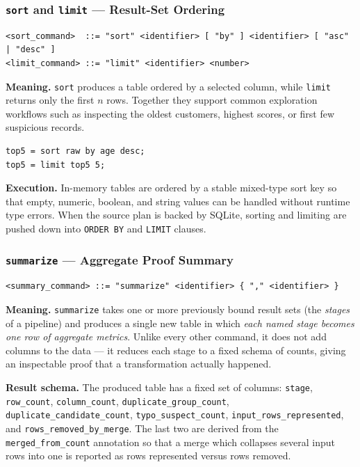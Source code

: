 \begin{itemize}[label=-, noitemsep]
\begin{itemize}[label=-, noitemsep]
\begin{itemize}[label=-, noitemsep]
\subsubsection{\texttt{sort} and \texttt{limit} --- Result-Set Ordering}

\begin{lstlisting}[style=bnf]
<sort_command>  ::= "sort" <identifier> [ "by" ] <identifier> [ "asc" | "desc" ]
<limit_command> ::= "limit" <identifier> <number>
\end{lstlisting}

\textbf{Meaning.} \texttt{sort} produces a table ordered by a selected column,
while \texttt{limit} returns only the first $n$ rows. Together they support
common exploration workflows such as inspecting the oldest customers, highest
scores, or first few suspicious records.

\begin{lstlisting}[style=dsl]
top5 = sort raw by age desc;
top5 = limit top5 5;
\end{lstlisting}

\textbf{Execution.} In-memory tables are ordered by a stable mixed-type sort
key so that empty, numeric, boolean, and string values can be handled without
runtime type errors. When the source plan is backed by SQLite, sorting and
limiting are pushed down into \texttt{ORDER BY} and \texttt{LIMIT} clauses.

\subsubsection{\texttt{summarize} --- Aggregate Proof Summary}

\begin{lstlisting}[style=bnf]
<summary_command> ::= "summarize" <identifier> { "," <identifier> }
\end{lstlisting}

\textbf{Meaning.} \texttt{summarize} takes one or more previously bound result
sets (the \emph{stages} of a pipeline) and produces a single new table in which
\emph{each named stage becomes one row of aggregate metrics}. Unlike every other
command, it does not add columns to the data --- it reduces each stage to a
fixed schema of counts, giving an inspectable proof that a transformation
actually happened.

\textbf{Result schema.} The produced table has a fixed set of columns:
\texttt{stage}, \texttt{row\_count}, \texttt{column\_count},
\texttt{duplicate\_group\_count}, \texttt{duplicate\_candidate\_count},
\texttt{typo\_suspect\_count}, \texttt{input\_rows\_represented}, and
\texttt{rows\_removed\_by\_merge}. The last two are derived from the
\texttt{merged\_from\_count} annotation so that a merge which collapses several
input rows into one is reported as rows represented versus rows removed.


\end{itemize}
\end{itemize}
\end{itemize}
